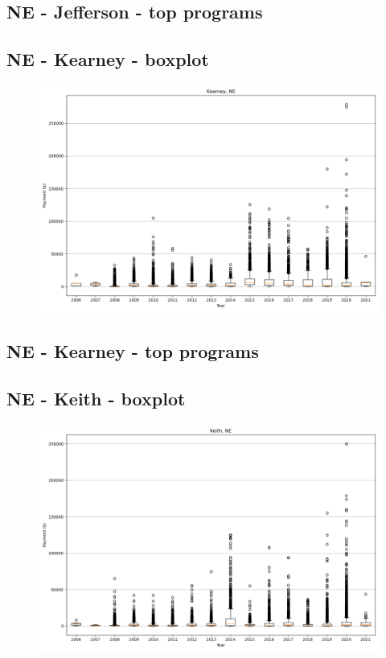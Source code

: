 \subsection*{NE - Jefferson - top programs}

\newpage
\subsection*{NE - Kearney - boxplot}
\begin{figure}[h]
\centering
\includegraphics[width=7in]{../output/boxplots/counties/Kearney-NE_boxplot.png}
\end{figure}


\subsection*{NE - Kearney - top programs}

\newpage
\subsection*{NE - Keith - boxplot}
\begin{figure}[h]
\centering
\includegraphics[width=7in]{../output/boxplots/counties/Keith-NE_boxplot.png}
\end{figure}


